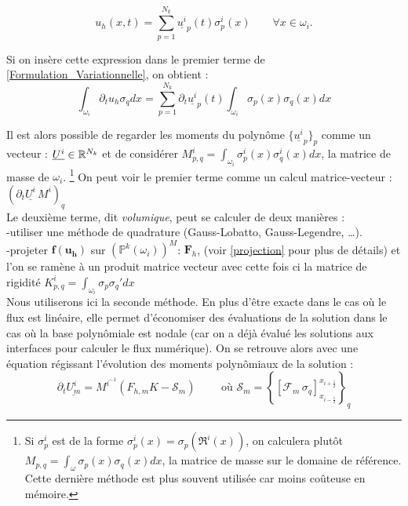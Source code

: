 \begin{equation}
    {u_h}(x,t) = \sum_{p=1}^{N_k} \underline{{u}^i}_p(t) \sigma_p^i(x)\qquad  \forall x\in \omega_i .
\end{equation}

Si on insère cette expression dans le premier terme de \eqref{Formulation_Variationnelle}, on obtient : 
\begin{equation}
   \int_{\omega_i} \partial_t {u_h} \sigma_q dx= \sum_{p=1}^{N_k} \partial_t \underline{{u}^i}_p(t) \int_{\omega_i} \sigma_p(x) \sigma_q(x)dx  
\end{equation}

\noindent
Il est alors possible de regarder les moments du polynôme $\{\underline{u^i}_p\}_p$ comme un vecteur : $\underline{U^i} \in \mathbb{R}^{N_k}$ et de considérer $M^i_{p,q} = \int_{\omega_i} \sigma_p^i(x) \sigma_q^i(x) dx$, la matrice de masse de $\omega_i$.
\footnote{Si $\sigma^i_p$ est de la forme $\sigma_p^i(x) = \sigma_p(\mathfrak{R}^i(x))$, on calculera plutôt $M_{p,q} = \int_{\omega} \sigma_p(x) \sigma_q(x) dx$, la matrice de masse sur le domaine de référence. 
Cette dernière méthode est plus souvent utilisée car moins coûteuse en mémoire.}
On peut voir le premier terme comme un calcul matrice-vecteur : $(\partial_t \underline{U^i} \, M^i)_q$\\

\noindent
Le deuxième terme, dit \textit{volumique}, peut se calculer de deux manières : \\
-utiliser une méthode de quadrature (Gauss-Lobatto, Gauss-Legendre, \dots).\\
-projeter $\mathbf{f}(\mathbf{u_h})$ sur $ \left(\mathbb{P}^k(\omega_i)\right)^M$: $\mathbf{F}_h$, (voir \ref{projection} pour plus de détails) et l'on se ramène à un produit matrice vecteur avec cette fois ci la matrice de rigidité $K^i_{p,q} = \int_{\omega_i}  \sigma_p \sigma_q' dx $\\
Nous utiliserons ici la seconde méthode. 
En plus d'être exacte dans le cas où le flux est linéaire, elle permet d'économiser des évaluations de la solution dans le cas où la base polynômiale est nodale 
(car on a déjà évalué les solutions aux interfaces pour calculer le flux numérique).
On se retrouve alors avec une équation régissant l'évolution des moments polynômiaux de la solution : 
\begin{equation}
    \partial_t \underline{U^i_m}= M^{i^{-1}} (F_{h,m} K - \mathcal{S}_m) \qquad \text{ où }  \mathcal{S}_m = \left\{ \left[ \mathcal{F}_m\, \sigma_q \right]_{x_{i-\frac{1}{2}}}^{x_{i+\frac{1}{2}}} \right\}_q  
\end{equation}


